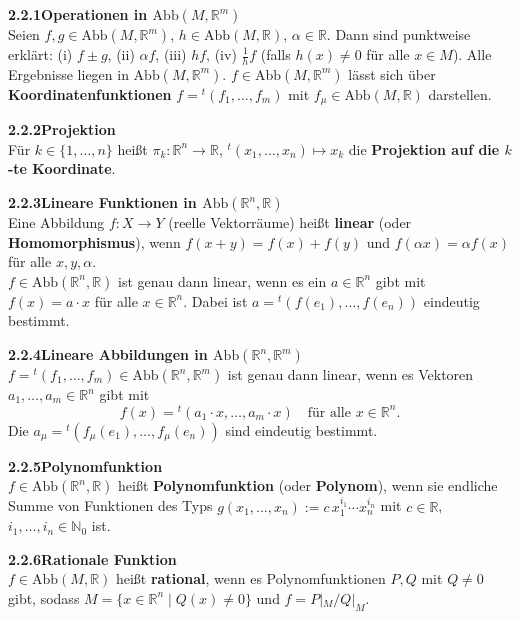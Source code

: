 \documentclass[a4paper,12pt]{article}
\newcommand{\gentry}[3]{%
  \noindent\textbf{#1\quad #2}\nopagebreak\\[0.2em]
  #3\par\smallskip
}
\begin{document}
\gentry{2.2.1}{Operationen in $\mathrm{Abb}(M, \mathbb{R}^m)$}{%
  Seien $f, g \in \mathrm{Abb}(M, \mathbb{R}^m)$, $h \in \mathrm{Abb}(M, \mathbb{R})$,
  $\alpha \in \mathbb{R}$. Dann sind punktweise erklärt:
  (i) $f \pm g$, \quad (ii) $\alpha f$, \quad (iii) $hf$,
  \quad (iv) $\frac{1}{h} f$ (falls $h(x) \neq 0$ für alle $x \in M$).
  Alle Ergebnisse liegen in $\mathrm{Abb}(M, \mathbb{R}^m)$.
  $f \in \mathrm{Abb}(M, \mathbb{R}^m)$ lässt sich über \textbf{Koordinatenfunktionen}
  $f = {}^t(f_1, \ldots, f_m)$ mit $f_\mu \in \mathrm{Abb}(M, \mathbb{R})$ darstellen.
}

\gentry{2.2.2}{Projektion}{%
  Für $k \in \{1, \ldots, n\}$ heißt
  $\pi_k: \mathbb{R}^n \to \mathbb{R}$, ${}^t(x_1, \ldots, x_n) \mapsto x_k$
  die \textbf{Projektion auf die $k$-te Koordinate}.
}

\gentry{2.2.3}{Lineare Funktionen in $\mathrm{Abb}(\mathbb{R}^n, \mathbb{R})$}{%
  Eine Abbildung $f: X \to Y$ (reelle Vektorräume) heißt \textbf{linear} (oder
  \textbf{Homomorphismus}), wenn
  $f(x + y) = f(x) + f(y)$ und $f(\alpha x) = \alpha f(x)$ für alle $x, y, \alpha$.\\
  $f \in \mathrm{Abb}(\mathbb{R}^n, \mathbb{R})$ ist genau dann linear, wenn es
  ein $a \in \mathbb{R}^n$ gibt mit $f(x) = a \cdot x$ für alle $x \in \mathbb{R}^n$.
  Dabei ist $a = {}^t(f(e_1), \ldots, f(e_n))$ eindeutig bestimmt.
}

\gentry{2.2.4}{Lineare Abbildungen in $\mathrm{Abb}(\mathbb{R}^n, \mathbb{R}^m)$}{%
  $f = {}^t(f_1, \ldots, f_m) \in \mathrm{Abb}(\mathbb{R}^n, \mathbb{R}^m)$ ist
  genau dann linear, wenn es Vektoren $a_1, \ldots, a_m \in \mathbb{R}^n$ gibt mit
  \[
    f(x) = {}^t(a_1 \cdot x, \ldots, a_m \cdot x) \quad \text{für alle } x \in \mathbb{R}^n.
  \]
  Die $a_\mu = {}^t(f_\mu(e_1), \ldots, f_\mu(e_n))$ sind eindeutig bestimmt.
}

\gentry{2.2.5}{Polynomfunktion}{%
  $f \in \mathrm{Abb}(\mathbb{R}^n, \mathbb{R})$ heißt \textbf{Polynomfunktion}
  (oder \textbf{Polynom}), wenn sie endliche Summe von Funktionen des Typs
  $g(x_1, \ldots, x_n) := c\, x_1^{i_1} \cdots x_n^{i_n}$
  mit $c \in \mathbb{R}$, $i_1, \ldots, i_n \in \mathbb{N}_0$ ist.
}

\gentry{2.2.6}{Rationale Funktion}{%
  $f \in \mathrm{Abb}(M, \mathbb{R})$ heißt \textbf{rational}, wenn es
  Polynomfunktionen $P, Q$ mit $Q \neq 0$ gibt, sodass
  $M = \{x \in \mathbb{R}^n \mid Q(x) \neq 0\}$ und $f = P|_M / Q|_M$.
}

\end{document}
